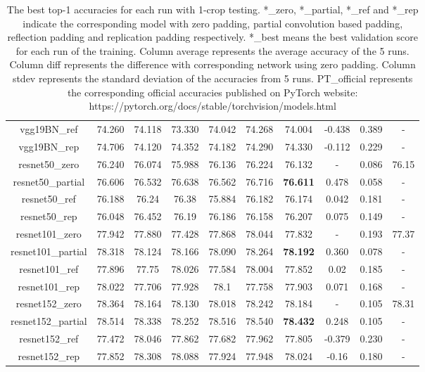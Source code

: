 \documentclass[10pt,twocolumn,letterpaper]{article}
\begin{document}
\begin{table*}
\begin{tabular}{c|ccccc|ccc||c}
vgg19BN\_ref&74.260 & 74.118 & 73.330 & 74.042 & 74.268 & 74.004 &-0.438&0.389& - \\
vgg19BN\_rep&74.706 & 74.120 & 74.352 &74.182& 74.290 &74.330&-0.112&0.229& - \\
\hline
resnet50\_zero&76.240&76.074&75.988&76.136&76.224&76.132& - &0.086 & 76.15 \\
resnet50\_partial&76.606&76.532&76.638&76.562&76.716&\textbf{76.611}&0.478&0.058 & - \\
resnet50\_ref & 76.188 & 76.24 & 76.38 & 75.884 & 76.182 & 76.174 & 0.042 & 0.181 & - \\
resnet50\_rep & 76.048 & 76.452 & 76.19 & 76.186 & 76.158 & 76.207 & 0.075 & 0.149 & - \\
\hline
resnet101\_zero&77.942&77.880&77.428&77.868&78.044&77.832& - &0.193 & 77.37 \\
resnet101\_partial&78.318&78.124&78.166&78.090&78.264&\textbf{78.192}&0.360&0.078 & - \\
resnet101\_ref&77.896&77.75&78.026&77.584&78.004&77.852&0.02&0.185&- \\
resnet101\_rep&78.022&77.706&77.928&78.1&77.758&77.903&0.071&0.168& - \\
\hline
resnet152\_zero&78.364&78.164&78.130&78.018&78.242&78.184& - &0.105 & 78.31 \\
resnet152\_partial&78.514&78.338&78.252&78.516&78.540&\textbf{78.432}&0.248&0.105 & - \\
resnet152\_ref & 77.472 & 78.046 & 77.862 & 77.682 & 77.962 & 77.805 & -0.379 & 0.230 & - \\
resnet152\_rep & 77.852 & 78.308 & 78.088 & 77.924 & 77.948 & 78.024 & -0.16 & 0.180 & - \\
    \end{tabular}
    \caption{The best top-1 accuracies for each run with 1-crop testing. *\_zero, *\_partial, *\_ref and *\_rep indicate the corresponding model with zero padding, partial convolution based padding, reflection padding and replication padding respectively. *\_best means the best validation score for each run of the training. Column average represents the average accuracy of the 5 runs. Column diff represents the difference with corresponding network using zero padding. Column stdev represents the standard deviation of the accuracies from 5 runs. PT\_official represents the corresponding official accuracies published on PyTorch website: https://pytorch.org/docs/stable/torchvision/models.html}
    \label{tab:best}
\end{table*}\begin{table*}%

\end{table*}
\end{document}
